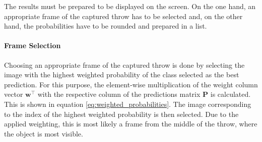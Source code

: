 The results must be prepared to be displayed on the screen.
On the one hand, an appropriate frame of the captured throw has to be selected and, on the other hand, the probabilities have to be rounded and prepared in a list.

\paragraph{Frame Selection}
Choosing an appropriate frame of the captured throw is done by selecting the image with the highest weighted probability of the class selected as the best prediction. %
For this purpose, the element-wise multiplication of the weight column vector $\boldsymbol{w}^\top$ with the respective column of the predictions matrix $\boldsymbol{P}$ is calculated.
This is shown in equation \ref{eq:weighted_probabilities}.
The image corresponding to the index of the highest weighted probability is then selected.
Due to the applied weighting, this is most likely a frame from the middle of the throw, where the object is most visible.

